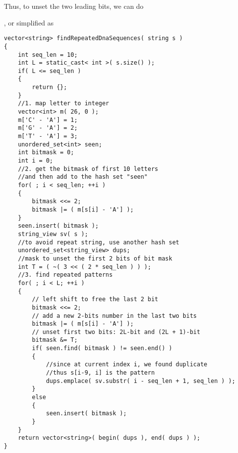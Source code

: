 Thus, to unset the two leading bits, we can do

, or simplified as 


\setcounter{lstlisting}{0}
\begin{lstlisting}[style=customc, caption={Hash Sets}]
vector<string> findRepeatedDnaSequences( string s )
{
    int seq_len = 10;
    int L = static_cast< int >( s.size() );
    if( L <= seq_len )
    {
        return {};
    }
    //1. map letter to integer
    vector<int> m( 26, 0 );
    m['C' - 'A'] = 1;
    m['G' - 'A'] = 2;
    m['T' - 'A'] = 3;
    unordered_set<int> seen;
    int bitmask = 0;
    int i = 0;
    //2. get the bitmask of first 10 letters
    //and then add to the hash set "seen"
    for( ; i < seq_len; ++i )
    {
        bitmask <<= 2;
        bitmask |= ( m[s[i] - 'A'] );
    }
    seen.insert( bitmask );
    string_view sv( s );
    //to avoid repeat string, use another hash set
    unordered_set<string_view> dups;
    //mask to unset the first 2 bits of bit mask
    int T = ( ~( 3 << ( 2 * seq_len ) ) );
    //3. find repeated patterns
    for( ; i < L; ++i )
    {
        // left shift to free the last 2 bit
        bitmask <<= 2;
        // add a new 2-bits number in the last two bits
        bitmask |= ( m[s[i] - 'A'] );
        // unset first two bits: 2L-bit and (2L + 1)-bit
        bitmask &= T;
        if( seen.find( bitmask ) != seen.end() )
        {
            //since at current index i, we found duplicate
            //thus s[i-9, i] is the pattern
            dups.emplace( sv.substr( i - seq_len + 1, seq_len ) );
        }
        else
        {
            seen.insert( bitmask );
        }
    }
    return vector<string>( begin( dups ), end( dups ) );
}
\end{lstlisting}